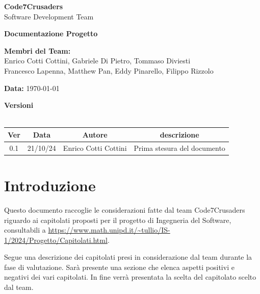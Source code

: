 \documentclass{article}
\begin{document}
\begin{titlepage}
    {\Huge \textbf{Code7Crusaders}}\\
    \vspace{0.5cm}
    {\Large Software Development Team}\\
    \vspace{2cm}
    
    {\large \textbf{Documentazione Progetto}}\\
    \vspace{5cm}

    \textbf{Membri del Team:}\\
    Enrico Cotti Cottini, Gabriele Di Pietro, Tommaso Diviesti \\
    Francesco Lapenna, Matthew Pan, Eddy Pinarello, Filippo Rizzolo \\
    \vspace{0.5cm}
    
    {\large \textbf{Data:}} \today\\
    
    \vspace{1cm}
\end{titlepage}

\newpage
\begin{center}
    \textbf{Versioni}
    \\
    \\
    \begin{tabular}{|c|c|c|c|}
        \hline
        \textbf{Ver} & \textbf{Data} & \textbf{Autore} & \textbf{descrizione}\\
        \hline
        0.1 & 21/10/24 & Enrico Cotti Cottini & Prima stesura del documento \\
        \hline
    \end{tabular}
\end{center}
\newpage

\section{Introduzione}

Questo documento raccoglie le considerazioni fatte dal team Code7Crusaders 
riguardo ai capitolati proposti per il progetto di Ingegneria del Software, 
consultabili a \url{https://www.math.unipd.it/~tullio/IS-1/2024/Progetto/Capitolati.html}. \newline

Segue una descrizione dei capitolati presi in considerazione dal team durante la fase di valutazione.
Sarà presente una sezione che elenca aspetti positivi e negativi dei vari capitolati.
In fine verrà presentata la scelta del capitolato scelto dal team.
\end{document}
